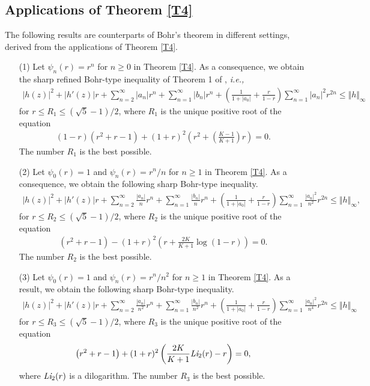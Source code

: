 \documentclass[11pt,reqno]{amsart}
\newtheorem{open problem}{Open problem}[section]
\newcommand{\beas}{\begin{eqnarray*}}
\newcommand{\eeas}{\end{eqnarray*}}
\numberwithin{equation}{section}
\begin{document}
\subsection{Applications of \textrm{Theorem \ref{T4}}}
The following results are counterparts of Bohr's theorem in different settings, derived from the applications of \textrm{Theorem \ref{T4}}.
\begin{itemize}
\item[(1)] Let $\psi_n(r)=r^n$ for $n\geq 0$ in \textrm{Theorem \ref{T4}}. As a consequence, we obtain the sharp refined Bohr-type inequality of \textrm{Theorem 1} of  \cite{KPS2018}, {\it i.e.,} 
\beas |h(z)|^2+|h'(z)|r+\sum_{n=2}^\infty |a_n| r^n+\sum_{n=1}^\infty |b_n| r^n+\left(\frac{1}{1+|a_0|}+\frac{r}{1-r}\right)\sum_{n=1}^\infty |a_n|^2 r^{2n}\leq \Vert h\Vert_\infty\eeas
for $r\leq R_1\leq (\sqrt{5}-1)/2$, where $R_1$ is the unique positive root of the equation
\beas (1-r)\left(r^2+r-1\right)+(1+r)^2\left(r^2+\left(\frac{K-1}{K+1}\right)r\right)=0.\eeas 
The number $R_1$ is the best possible.
\item[(2)] Let $\psi_0(r)=1$ and $\psi_n(r)=r^n/n$ for $n\geq 1$ in \textrm{Theorem \ref{T4}}. As a consequence, we obtain the following sharp Bohr-type inequality.
\beas |h(z)|^2+|h'(z)|r+\sum_{n=2}^\infty \frac{|a_n|}{n}r^n+\sum_{n=1}^\infty \frac{|b_n|}{n}r^n+\left(\frac{1}{1+|a_0|}+\frac{r}{1-r}\right)\sum_{n=1}^\infty \frac{|a_n|^2}{n^2} r^{2n}\leq \Vert h\Vert_\infty,\eeas
for $r\leq R_2\leq (\sqrt{5}-1)/2$, where $R_2$ is the unique positive root of the equation
\beas\left(r^2+r-1\right)-(1+r)^2\left(r+\frac{2K}{K+1}\log(1-r)\right)=0.\eeas 
The number $R_2$ is the best possible.
\item[(3)] Let $\psi_0(r)=1$ and $\psi_n(r)=r^n/n^2$ for $n\geq 1$ in \textrm{Theorem \ref{T4}}. As a result, we obtain the following sharp Bohr-type inequality.
\beas |h(z)|^2+|h'(z)|r+\sum_{n=2}^\infty \frac{|a_n|}{n^2}r^n+\sum_{n=1}^\infty \frac{|b_n|}{n^2}r^n+\left(\frac{1}{1+|a_0|}+\frac{r}{1-r}\right)\sum_{n=1}^\infty \frac{|a_n|^2}{n^4} r^{2n}\leq \Vert h\Vert_\infty\eeas
for $r\leq R_3\leq (\sqrt{5}-1)/2$, where $R_3$ is the unique positive root of the equation
\beas\left(r^2+r-1\right)+(1+r)^2\left(\frac{2K}{K+1}\text{\it Li}_2(r)-r\right)=0,\eeas 
where $\text{\it Li}_2(r)$ is a dilogarithm. The number $R_3$ is the best possible.
\end{itemize}
\end{document}
